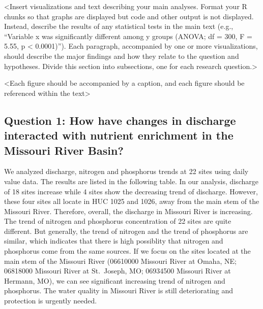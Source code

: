 \documentclass[12pt,]{article}
\begin{document}
\textless{}Insert visualizations and text describing your main analyses.
Format your R chunks so that graphs are displayed but code and other
output is not displayed. Instead, describe the results of any
statistical tests in the main text (e.g., ``Variable x was significantly
different among y groups (ANOVA; df = 300, F = 5.55, p \textless{}
0.0001)''). Each paragraph, accompanied by one or more visualizations,
should describe the major findings and how they relate to the question
and hypotheses. Divide this section into subsections, one for each
research question.\textgreater{}

\textless{}Each figure should be accompanied by a caption, and each
figure should be referenced within the text\textgreater{}

\hypertarget{question-1-how-have-changes-in-discharge-interacted-with-nutrient-enrichment-in-the-missouri-river-basin}{%
\subsection{Question 1: How have changes in discharge interacted with
nutrient enrichment in the Missouri River
Basin?}\label{question-1-how-have-changes-in-discharge-interacted-with-nutrient-enrichment-in-the-missouri-river-basin}}

We analyzed discharge, nitrogen and phosphorus trends at 22 sites using
daily value data. The results are listed in the following table. In our
analysis, discharge of 18 sites increase while 4 sites show the
decreasing trend of discharge. However, these four sites all locate in
HUC 1025 and 1026, away from the main stem of the Missouri River.
Therefore, overall, the discharge in Missouri River is increasing. The
trend of nitrogen and phosphorus concentration of 22 sites are quite
different. But generally, the trend of nitrogen and the trend of
phosphorus are similar, which indicates that there is high possiblity
that nitrogen and phosphorus come from the same sources. If we focus on
the sites located at the main stem of the Missouri River (06610000
Missouri River at Omaha, NE; 06818000 Missouri River at St.~Joseph, MO;
06934500 Missouri River at Hermann, MO), we can see significant
increasing trend of nitrogen and phosphorus. The water quality in
Missouri River is still deteriorating and protection is urgently needed.
\end{document}

